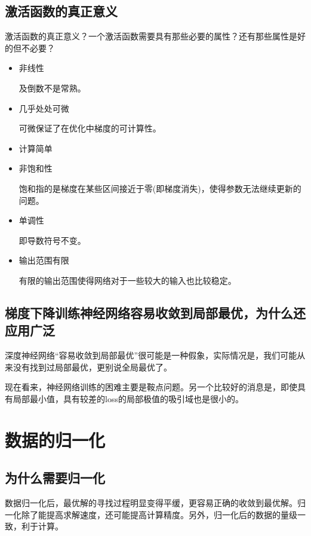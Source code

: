 \subsection{激活函数的真正意义}

激活函数的真正意义？一个激活函数需要具有那些必要的属性？还有那些属性是好的但不必要？

\begin{itemize}
\item 非线性

及倒数不是常熟。

\item 几乎处处可微

可微保证了在优化中梯度的可计算性。

\item 计算简单

\item 非饱和性

饱和指的是梯度在某些区间接近于零(即梯度消失)，使得参数无法继续更新的问题。

\item 单调性

即导数符号不变。

\item 输出范围有限

有限的输出范围使得网络对于一些较大的输入也比较稳定。

\end{itemize}

\subsection{梯度下降训练神经网络容易收敛到局部最优，为什么还应用广泛}

深度神经网络“容易收敛到局部最优”很可能是一种假象，实际情况是，我们可能从来没有找到过局部最优，更别说全局最优了。

现在看来，神经网络训练的困难主要是鞍点问题。另一个比较好的消息是，即使具有局部最小值，具有较差的loss的局部极值的吸引域也是很小的。


\section{数据的归一化}

\subsection{为什么需要归一化}

数据归一化后，最优解的寻找过程明显变得平缓，更容易正确的收敛到最优解。归一化除了能提高求解速度，还可能提高计算精度。另外，归一化后的数据的量级一致，利于计算。

